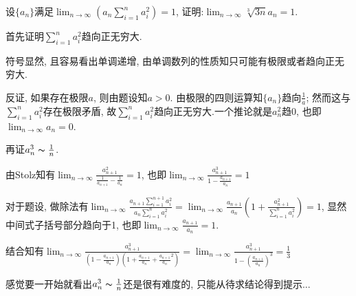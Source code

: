      \begin{exercise}
         设$\{a_n\}$满足$\lim_{n\to\infty}(a_n \sum_{i=1}^{n}a_i^2)=1$, 证明:$\lim_{n\to\infty}\sqrt[3]{3n}a_n=1$.
     \end{exercise}
     \begin{solution}

         首先证明$\sum_{i=1}^{n}a_i^2$趋向正无穷大.

         符号显然, 且容易看出单调递增, 由单调数列的性质知只可能有极限或者趋向正无穷大.

         反证, 如果存在极限$a$, 则由题设知$a>0$. 由极限的四则运算知$\{a_n\}$趋向$\frac{1}{a}$; 然而这与$\sum_{i=1}^{n}a_i^2$存在极限矛盾, 故$\sum_{i=1}^{n}a_i^2$趋向正无穷大.一个推论就是$a_n^2$趋0, 也即$\lim_{n\to\infty} a_n=0$.

         再证$a_n^3\thicksim \frac{1}{n}$.

         由Stolz知有$\lim_{n\to\infty}\frac{a_{n+1}^2}{\frac{1}{a_{n+1}}-\frac{1}{a_n}}=1$, 也即$\lim_{n\to\infty}\frac{a_{n+1}^3}{1-\frac{a_{n+1}}{a_n}}=1$

         对于题设, 做除法有$\lim_{n\to\infty}\frac{a_{n+1}\sum_{i=1}^{n+1}a_i^2}{a_n \sum_{i=1}^{n}a_i^2}=\lim_{n\to\infty}\frac{a_{n+1}}{a_n}(1+\frac{a_{n+1}^2}{\sum_{i=1}^{n}a_i^2})=1$, 显然中间式子括号部分趋向于1, 也即$\lim_{n\to\infty}\frac{a_{n+1}}{a_n}=1$.

         结合知有$\lim_{n\to\infty}\frac{a_{n+1}^3}{(1-\frac{a_{n+1}}{a_n})(1+\frac{a_{n+1}}{a_n}+\frac{a_{n+1}}{a_n}^2)}=\lim_{n\to\infty}\frac{a_{n+1}^3}{1-(\frac{a_{n+1}}{a_n})^3}=\frac{1}{3}$
     \end{solution}
     \begin{note}
         感觉要一开始就看出$a_n^3\thicksim \frac{1}{n}$还是很有难度的, 只能从待求结论得到提示...
     \end{note}
